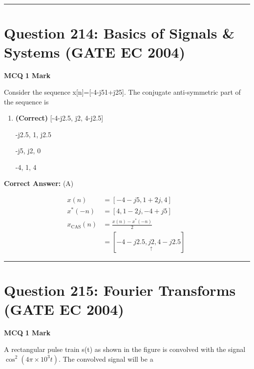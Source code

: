 \documentclass[11pt,a4paper]{article}
\begin{document}
\vspace{1.5em}
\hrule
\vspace{1.5em}

\section*{Question 214: Basics of Signals \& Systems (GATE EC 2004)}
\noindent \textbf{\color{primary}MCQ} \hfill \textbf{\color{secondary}1 Mark}


\noindent Consider the sequence x[n]=[-4-j51+j25]. The conjugate anti-symmetric part of the sequence is


\begin{enumerate}[label=(\Alph*)]
    \item \textbf{(Correct)} [-4-j2.5, j2, 4-j2.5]
    \item [-j2.5, 1, j2.5]
    \item [-j5, j2, 0]
    \item [-4, 1, 4]
\end{enumerate}

\noindent \textbf{Correct Answer:} (A)

\begin{tcolorbox}[solbox, title=Detailed Solution -- Question 214]
\[
\begin{aligned} x(n) &=[-4-j 5,1+2 j, 4] \\ x^{*}(-n) &=[4,1-2 j,-4+j 5] \\ x_{\mathrm{CAS}}(n) &=\frac{x(n)-x^{*}(-n)}{2} \\ &=[-4-j2.5 , \underset{\uparrow}{j2} , 4-j2.5]\ \end{aligned}
\]
\end{tcolorbox}

\vspace{1.5em}
\hrule
\vspace{1.5em}

\section*{Question 215: Fourier Transforms (GATE EC 2004)}
\noindent \textbf{\color{primary}MCQ} \hfill \textbf{\color{secondary}1 Mark}


\noindent A rectangular pulse train s(t) as shown in the figure is convolved with the signal $\cos^{2}(4\pi \times 10^{3}t)$. The convolved signal will be a 
\end{document}
